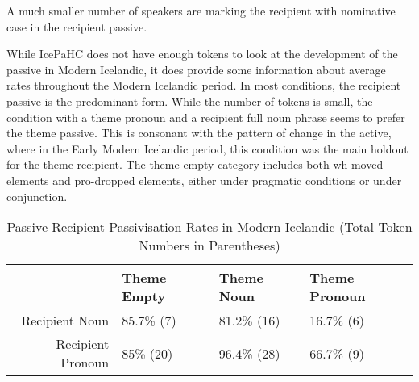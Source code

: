 \begin{exe}
\end{exe}
 A much smaller number of speakers are marking the recipient with nominative case in the recipient passive.
 \begin{exe}
\end{exe}
While IcePaHC does not have enough tokens to look at the development of the passive in Modern Icelandic, it does provide some information about average rates throughout the Modern Icelandic period. In most conditions, the recipient passive is the predominant form. While the number of tokens is small, the condition with a theme pronoun and a recipient full noun phrase seems to prefer the theme passive. This is consonant with the pattern of change in the active, where in the Early Modern Icelandic period, this condition was the main holdout for the theme-recipient. The theme empty category includes both wh-moved elements and pro-dropped elements, either under pragmatic conditions or under conjunction.

\begin{table}[ht]
\centering
\begin{tabular}{rlll}
  \hline
 & Theme Empty & Theme Noun & Theme Pronoun \\ 
  \hline
Recipient Noun & 85.7\% (7) & 81.2\% (16) & 16.7\% (6) \\ 
  Recipient Pronoun & 85\% (20) & 96.4\% (28) & 66.7\% (9) \\ 
   \hline
\end{tabular}
\caption{Passive Recipient Passivisation Rates in Modern Icelandic (Total Token Numbers in Parentheses)} 
\end{table}

